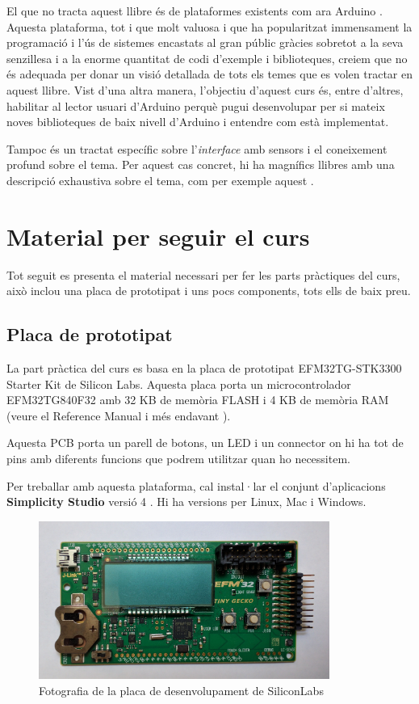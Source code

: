 El que no tracta aquest llibre és de plataformes existents com ara Arduino \cite{ARDUINO}. Aquesta plataforma, tot i que molt valuosa i que ha popularitzat immensament la programació i l'ús de sistemes encastats al gran públic gràcies sobretot a la seva senzillesa i a la enorme quantitat de codi d'exemple i biblioteques, creiem que no és adequada per donar un visió detallada de tots els temes que es volen tractar en aquest llibre. Vist d'una altra manera, l'objectiu d'aquest curs és, entre d'altres, habilitar al lector usuari d'Arduino perquè pugui desenvolupar per si mateix noves biblioteques de baix nivell d'Arduino i entendre com està implementat.

Tampoc és un tractat específic sobre l'{\em interface} amb sensors i el coneixement profund sobre el tema. Per aquest cas concret, hi ha magnífics llibres amb una descripció exhaustiva sobre el tema, com per exemple aquest \cite{SensorTechnology}.

\section{Material per seguir el curs}
Tot seguit es presenta el material necessari per fer les parts pràctiques del curs, això inclou una placa de prototipat i uns pocs components, tots ells de baix preu.

\subsection{Placa de prototipat}
La part pràctica del curs es basa en la placa de prototipat EFM32TG-STK3300 Starter Kit de Silicon Labs. Aquesta placa porta un microcontrolador EFM32TG840F32 amb 32 KB de memòria \gls{FLASH} i 4 KB de memòria \gls{RAM} (veure el Reference Manual \cite{EFM32TGRM} i més endavant ).

Aquesta \gls{PCB} porta un parell de botons, un \gls{LED} i un connector on hi ha tot de pins amb diferents funcions que podrem utilitzar quan ho necessitem.

Per treballar amb aquesta plataforma, cal instal·lar el conjunt d'aplicacions {\bf Simplicity Studio} versió 4 \cite{simplicityURL}. Hi ha versions per Linux, Mac i Windows.

\begin{figure}
 \centering
 \includegraphics[width=0.85\textwidth, keepaspectratio]{imatges/tiny-gecko-starter-kit.jpg}
 \caption{Fotografia de la placa de desenvolupament de SiliconLabs}
 \label{fig:EFM32_DVK}
\end{figure}


